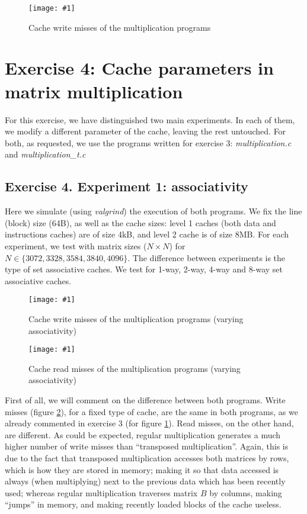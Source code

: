 \documentclass{article}
\newcommand{\myFigure}[4]{%
    \begin{figure}[!ht]
        \texttt{[image: \#1]}
        \centering
        \caption{#2}
        \label{#3}
    \end{figure}
}
\begin{document}
\myFigure{../material_P3/out3/mv_att2/mult_cache_write.png}{Cache write misses of the multiplication programs}{mult_misses_write}{0.5}


\section*{Exercise 4: Cache parameters in matrix multiplication}

For this exercise, we have distinguished two main experiments. In each of them, we modify a different parameter of the cache, leaving the rest untouched. For both, as requested, we use the programs written for exercise 3: \emph{multiplication.c} and \emph{multiplication\_t.c}


\subsection*{Exercise 4. Experiment 1: associativity}

Here we simulate (using \emph{valgrind}) the execution of both programs. We fix the line (block) size (64B), as well as the cache sizes: level 1 caches (both data and instructions caches) are of size 4kB, and level 2 cache is of size 8MB. For each experiment, we test with matrix sizes ($N\times N$) for $N\in\{3072,3328,3584,3840,4096\}$. The difference between experiments is the type of set associative caches. We test for 1-way, 2-way, 4-way and 8-way set associative caches.

\myFigure{../material_P3/protect_out4/asoc/p2/4096/escritura.png}{Cache write misses of the multiplication programs (varying associativity)}{asoc_escritura}{0.517}

\myFigure{../material_P3/protect_out4/asoc/p2/4096/lectura.png}{Cache read misses of the multiplication programs (varying associativity)}{asoc_lectura}{0.517}

First of all, we will comment on the difference between both programs. Write misses (figure \ref{asoc_escritura}), for a fixed type of cache, are the same in both programs, as we already commented in exercise 3 (for figure \ref{mult_misses_write}). Read misses, on the other hand, are different. As could be expected, regular multiplication generates a much higher number of write misses than ``transposed multiplication''. Again, this is due to the fact that transposed multiplication accesses both matrices by rows, which is how they are stored in memory; making it so that data accessed is always (when multiplying) next to the previous data which has been recently used; whereas regular multiplication traverses matrix $B$ by columns, making ``jumps'' in memory, and making recently loaded blocks of the cache useless.
\end{document}
